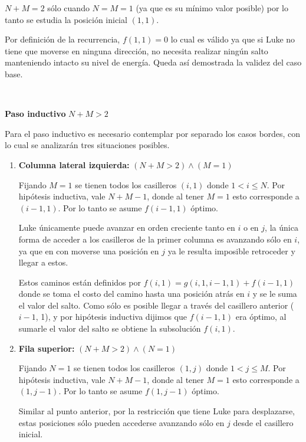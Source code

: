 	$N + M = 2$ sólo cuando $N = M = 1$ (ya que es su mínimo valor posible)
	por lo tanto se estudia la posición inicial $(1, 1)$.

	Por definición de la recurrencia, $f(1, 1) = 0$ lo cual es válido ya que si
	Luke no tiene que moverse en ninguna dirección, no necesita realizar ningún
	salto manteniendo intacto su nivel de energía. Queda así demostrada la
	validez del caso base.

	~

	\textbf{Paso inductivo} $N + M > 2$

	Para el paso inductivo es necesario contemplar por separado los casos
	bordes, con lo cual se analizarán tres situaciones posibles.

	\begin{enumerate}
		\item{
			\textbf{Columna lateral izquierda: } $(N + M > 2) \land (M = 1)$

			Fijando $M = 1$ se tienen todos los casilleros $(i, 1)$ donde $1 < i
			\leq N$. Por hipótesis inductiva, vale $N + M - 1$, donde al tener
			$M = 1$ esto corresponde a $(i - 1, 1)$. Por lo tanto se asume $f(i
			- 1, 1)$ óptimo.

			Luke únicamente puede avanzar en orden creciente tanto en $i$
			o en $j$, la única forma de acceder a los casilleros de la primer
			columna es avanzando sólo en $i$, ya que en con moverse
			una posición en $j$ ya le resulta imposible retroceder y llegar a
			estos.

			Estos caminos están definidos por $f(i, 1) = g(i, 1, i - 1, 1) + f(i
			- 1, 1)$ donde se toma el costo del camino hasta una posición atrás
			en $i$ y se le suma el valor del salto. Como sólo es posible llegar
			a través del casillero anterior ($i - 1$, 1), y por hipótesis inductiva
			dijimos que $f(i - 1, 1)$ era óptimo, al sumarle el valor del salto
			se obtiene la subsolución $f(i, 1)$.
		}
		\item{
			\textbf{Fila superior: } $(N + M > 2) \land (N = 1)$

			Fijando $N = 1$ se tienen todos los casilleros $(1, j)$ donde $1 < j
			\leq M$. Por hipótesis inductiva, vale $N + M - 1$, donde al tener
			$M = 1$ esto corresponde a $(1, j - 1)$. Por lo tanto se asume $f(1
			, j - 1)$ óptimo.

			Similar al punto anterior, por la restricción que tiene Luke para
			desplazarse, estas posiciones sólo pueden accederse avanzando sólo
			en $j$ desde el casillero inicial.

}
\end{enumerate}
